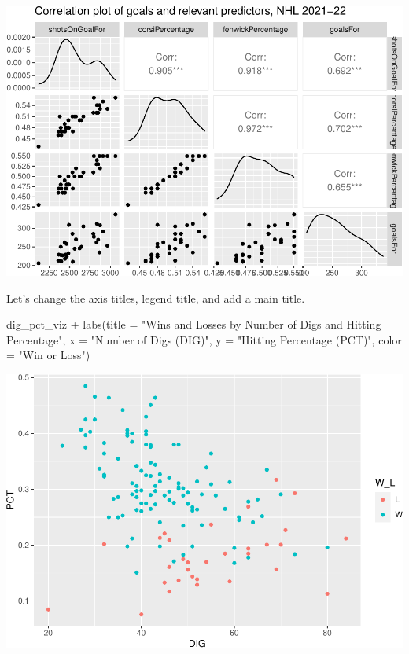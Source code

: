 \documentclass[
  11pt,
]{book}
\newenvironment{Shaded}{\begin{snugshade}}{\end{snugshade}}
\newcommand{\AttributeTok}[1]{\textcolor[rgb]{0.77,0.63,0.00}{#1}}
\newcommand{\FunctionTok}[1]{\textcolor[rgb]{0.00,0.00,0.00}{#1}}
\newcommand{\NormalTok}[1]{#1}
\newcommand{\SpecialCharTok}[1]{\textcolor[rgb]{0.00,0.00,0.00}{#1}}
\newcommand{\StringTok}[1]{\textcolor[rgb]{0.31,0.60,0.02}{#1}}
\theoremstyle{definition}
\theoremstyle{definition}
\theoremstyle{definition}
\theoremstyle{definition}
\theoremstyle{remark}
\begin{document}
\includegraphics{series_files/figure-latex/unnamed-chunk-31-1.pdf}

Let's change the axis titles, legend title, and add a main title.

\begin{Shaded}
\begin{Highlighting}[]
\NormalTok{dig\_pct\_viz }\SpecialCharTok{+} \FunctionTok{labs}\NormalTok{(}\AttributeTok{title =} \StringTok{"Wins and Losses by Number of Digs and Hitting Percentage"}\NormalTok{,}
    \AttributeTok{x =} \StringTok{"Number of Digs (DIG)"}\NormalTok{, }\AttributeTok{y =} \StringTok{"Hitting Percentage (PCT)"}\NormalTok{, }\AttributeTok{color =} \StringTok{"Win or Loss"}\NormalTok{)}
\end{Highlighting}
\end{Shaded}

\includegraphics{series_files/figure-latex/unnamed-chunk-32-1.pdf}
\end{document}
